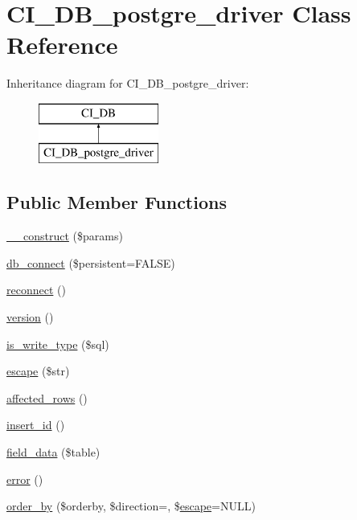 \hypertarget{class_c_i___d_b__postgre__driver}{}\section{C\+I\+\_\+\+D\+B\+\_\+postgre\+\_\+driver Class Reference}
\label{class_c_i___d_b__postgre__driver}
Inheritance diagram for C\+I\+\_\+\+D\+B\+\_\+postgre\+\_\+driver\+:\begin{figure}[H]
\begin{center}
\leavevmode
\includegraphics[height=2.000000cm]{class_c_i___d_b__postgre__driver}
\end{center}
\end{figure}
\subsection*{Public Member Functions}
\begin{DoxyCompactItemize}
\item 
\mbox{\hyperlink{class_c_i___d_b__postgre__driver_a6994482eff405aa57460ac34396e0731}{\+\_\+\+\_\+construct}} (\$params)
\item 
\mbox{\hyperlink{class_c_i___d_b__postgre__driver_a6e4aac2e78d4b010c05ec7ce170075f2}{db\+\_\+connect}} (\$persistent=F\+A\+L\+SE)
\item 
\mbox{\hyperlink{class_c_i___d_b__postgre__driver_a18718ddd05fe1f4c6c8ecab286cab6f7}{reconnect}} ()
\item 
\mbox{\hyperlink{class_c_i___d_b__postgre__driver_a3a6f15892ccf0bb8957fc209fecb8c18}{version}} ()
\item 
\mbox{\hyperlink{class_c_i___d_b__postgre__driver_a13091d7a398eda43e051d06f321077a7}{is\+\_\+write\+\_\+type}} (\$sql)
\item 
\mbox{\hyperlink{class_c_i___d_b__postgre__driver_a1877cca54c45c21d61e06d59354eea45}{escape}} (\$str)
\item 
\mbox{\hyperlink{class_c_i___d_b__postgre__driver_a6e1579e0954095958ab46b9cf5d4ee15}{affected\+\_\+rows}} ()
\item 
\mbox{\hyperlink{class_c_i___d_b__postgre__driver_a1bf025995b0b8f14bfaa40a3ca868ce6}{insert\+\_\+id}} ()
\item 
\mbox{\hyperlink{class_c_i___d_b__postgre__driver_ac07826d01e7a000b7ba61f735133b8ba}{field\+\_\+data}} (\$table)
\item 
\mbox{\hyperlink{class_c_i___d_b__postgre__driver_a6b9e87c5af0bcc3b012dad708b611d1b}{error}} ()
\item 
\mbox{\hyperlink{class_c_i___d_b__postgre__driver_ab30bc24a439623b27ec29af1b6c512e0}{order\+\_\+by}} (\$orderby, \$direction=\textquotesingle{}\textquotesingle{}, \$\mbox{\hyperlink{class_c_i___d_b__postgre__driver_a1877cca54c45c21d61e06d59354eea45}{escape}}=N\+U\+LL)
\end{DoxyCompactItemize}
